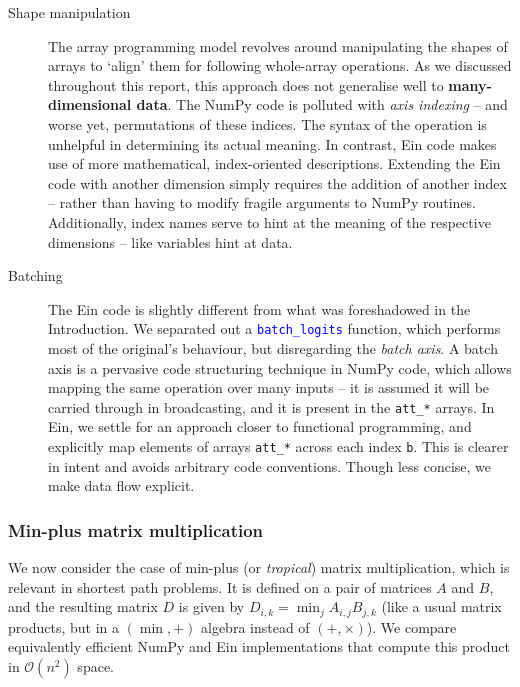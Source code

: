 \begin{description}
    \item[Shape manipulation] The array programming model revolves around manipulating the shapes of arrays to `align' them for following whole-array operations. As we discussed throughout this report, this approach does not generalise well to \textbf{many-dimensional data}. The NumPy code is polluted with \textit{axis indexing} -- and worse yet, permutations of these indices. The syntax of the operation is unhelpful in determining its actual meaning. In contrast, Ein code makes use of more mathematical, index-oriented descriptions. Extending the Ein code with another dimension simply requires the addition of another index -- rather than having to modify fragile arguments to NumPy routines. Additionally, index names serve to hint at the meaning of the respective dimensions -- like variables hint at data.
    \item[Batching] The Ein code is slightly different from what was foreshadowed in the Introduction. We separated out a \textcolor{blue}{\texttt{batch\_logits}} function, which performs most of the original's behaviour, but disregarding the \textit{batch axis}. A batch axis is a pervasive code structuring technique in NumPy code, which allows mapping the same operation over many inputs -- it is assumed it will be carried through in broadcasting, and it is present in the \texttt{att\_*} arrays. In Ein, we settle for an approach closer to functional programming, and explicitly map elements of arrays \texttt{att\_*} across each index \texttt{b}. This is clearer in intent and avoids arbitrary code conventions. Though less concise, we make data flow explicit.
\end{description}

\subsubsection{Min-plus matrix multiplication}

We now consider the case of min-plus (or \textit{tropical}) matrix multiplication, which is relevant in shortest path problems. It is defined on a pair of matrices $A$ and $B$, and the resulting matrix $D$ is given by $D_{i,k} = \min_{j} A_{i,j} B_{j,k}$ (like a usual matrix products, but in a $(\min, +)$ algebra instead of $(+, \times)$). We compare equivalently efficient NumPy and Ein implementations that compute this product in $\mathcal O(n^2)$ space.

